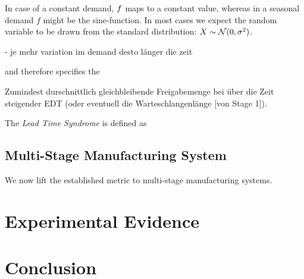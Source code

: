 \documentclass[mnsc]{informs3}
\begin{document}
\begin{example}
  In case of a constant demand, ${f}$ maps to a constant value, whereas in a seasonal demand $f$
  might be the sine-function. In most cases we expect the random variable to be drawn from the
  standard distribution: $X \sim \mathcal{N}(0,\sigma^{2})$.
\end{example}


- je mehr variation im demand desto länger die zeit


and therefore specifies the


Zumindest durschnittlich gleichbleibende Freigabemenge bei über die Zeit steigender EDT (oder
eventuell die Warteschlangenlänge [von Stage 1]).


\begin{definition}
  The \emph{Lead Time Syndrome} is defined as
\end{definition}



\subsection{Multi-Stage Manufacturing System}
\label{subsec:Multi-Stage_Manufacturing_System}


We now lift the established metric to multi-stage manufacturing systems.


\section{Experimental Evidence}
\label{sec:Experimental_Evidence}


\section{Conclusion}
\label{sec:Conclusion}




\end{document}
